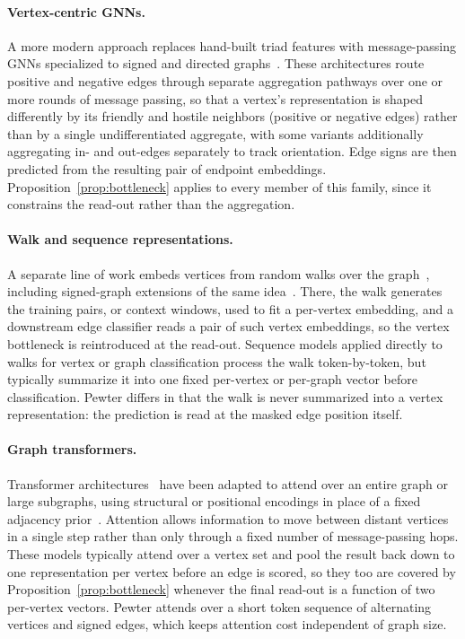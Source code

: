 \documentclass[sigconf, review, anonymous]{acmart}
\theoremstyle{plain}
\theoremstyle{definition}
\begin{document}
\paragraph{Vertex-centric GNNs.}
\label{par:vertex-centric-gnns}
A more modern approach replaces hand-built triad features with message-passing GNNs specialized to signed and directed graphs~\citep{derr2018signed, huang2019signed, li2020learning, liu2021signed}. These architectures route positive and negative edges through separate aggregation pathways over one or more rounds of message passing, so that a vertex's representation is shaped differently by its friendly and hostile neighbors (positive or negative edges) rather than by a single undifferentiated aggregate, with some variants additionally aggregating in- and out-edges separately to track orientation. Edge signs are then predicted from the resulting pair of endpoint embeddings. Proposition~\ref{prop:bottleneck} applies to every member of this family, since it constrains the read-out rather than the aggregation.

\paragraph{Walk and sequence representations.} A separate line of work embeds vertices from random walks over the graph~\citep{perozzi2014deepwalk, grover2016node2vec}, including signed-graph extensions of the same idea~\citep{kim2018side, islam2018signet}. There, the walk generates the training pairs, or context windows, used to fit a per-vertex embedding, and a downstream edge classifier reads a pair of such vertex embeddings, so the vertex bottleneck is reintroduced at the read-out. Sequence models applied directly to walks for vertex or graph classification process the walk token-by-token, but typically summarize it into one fixed per-vertex or per-graph vector before classification. Pewter differs in that the walk is never summarized into a vertex representation: the prediction is read at the masked edge position itself.

\paragraph{Graph transformers.} Transformer architectures~\citep{vaswani2017attention} have been adapted to attend over an entire graph or large subgraphs, using structural or positional encodings in place of a fixed adjacency prior~\citep{dwivedi2021generalization, ying2021transformers, rampavsek2022recipe}. Attention allows information to move between distant vertices in a single step rather than only through a fixed number of message-passing hops. These models typically attend over a vertex set and pool the result back down to one representation per vertex before an edge is scored, so they too are covered by Proposition~\ref{prop:bottleneck} whenever the final read-out is a function of two per-vertex vectors. Pewter attends over a short token sequence of alternating vertices and signed edges, which keeps attention cost independent of graph size.
\end{document}
